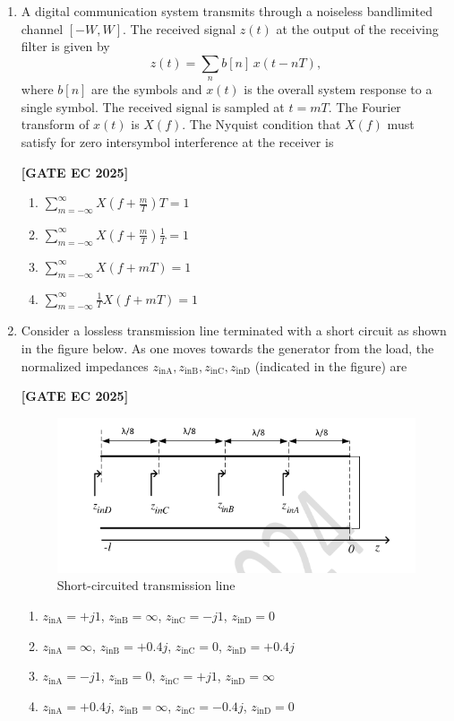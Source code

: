 \documentclass[12pt]{article}
\begin{document}
\begin{enumerate}[leftmargin=1.5em, label=\textbf{Q.\arabic*}., itemsep=2em]
\item A digital communication system transmits through a noiseless bandlimited channel $[-W, W]$. The received signal $z(t)$ at the output of the receiving filter is given by
\[
z(t) = \sum_n b[n]\,x(t-nT),
\]
where $b[n]$ are the symbols and $x(t)$ is the overall system response to a single symbol. The received signal is sampled at $t = mT$. The Fourier transform of $x(t)$ is $X(f)$. The Nyquist condition that $X(f)$ must satisfy for zero intersymbol interference at the receiver is

\noindent \textbf{[GATE EC 2025]}
\begin{multicols}{2}
\begin{enumerate}
    \item $\sum_{m=-\infty}^{\infty} X\!\left(f+\tfrac{m}{T}\right)T = 1$
    \item $\sum_{m=-\infty}^{\infty} X\!\left(f+\tfrac{m}{T}\right)\tfrac{1}{T} = 1$
    \item $\sum_{m=-\infty}^{\infty} X(f+mT) = 1$
    \item $\sum_{m=-\infty}^{\infty} \tfrac{1}{T} X(f+mT) = 1$
\end{enumerate}
\end{multicols}

\item Consider a lossless transmission line terminated with a short circuit as shown in the figure below. As one moves towards the generator from the load, the normalized impedances $z_{\text{inA}}, z_{\text{inB}}, z_{\text{inC}}, z_{\text{inD}}$ (indicated in the figure) are

\noindent \textbf{[GATE EC 2025]}
\begin{figure}[H]\centering
\includegraphics[width=0.65\columnwidth]{figs/q15.png}
\caption{Short-circuited transmission line}
\label{fig:q15}
\end{figure}
\begin{multicols}{2}
\begin{enumerate}
    \item $z_{\text{inA}} = +j1$, $z_{\text{inB}} = \infty$, $z_{\text{inC}} = -j1$, $z_{\text{inD}} = 0$
    \item $z_{\text{inA}} = \infty$, $z_{\text{inB}} = +0.4j$, $z_{\text{inC}} = 0$, $z_{\text{inD}} = +0.4j$
    \item $z_{\text{inA}} = -j1$, $z_{\text{inB}} = 0$, $z_{\text{inC}} = +j1$, $z_{\text{inD}} = \infty$
    \item $z_{\text{inA}} = +0.4j$, $z_{\text{inB}} = \infty$, $z_{\text{inC}} = -0.4j$, $z_{\text{inD}} = 0$
\end{enumerate}
\end{multicols}


\end{enumerate}
\end{document}
